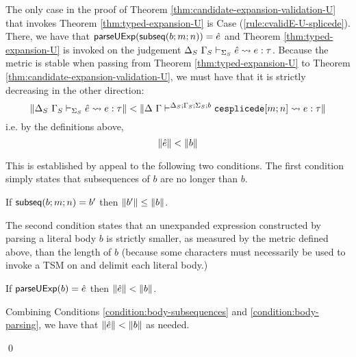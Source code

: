 The only case in the proof of Theorem \ref{thm:candidate-expansion-validation-U} that invokes Theorem \ref{thm:typed-expansion-U} is Case (\ref{rule:cvalidE-U-splicede}). There, we have that $\mathsf{parseUExp}(\mathsf{subseq}(b; m; n))=\hat{e}$ and Theorem \ref{thm:typed-expansion-U} is invoked on the judgement $\Delta_S~\Gamma_S \vdash_{\Sigma_S} \hat{e} \leadsto e : \tau$. Because the metric is stable when passing from Theorem \ref{thm:typed-expansion-U} to Theorem \ref{thm:candidate-expansion-validation-U}, we must have that it is strictly decreasing in the other direction:
\[\Vert \Delta_S~\Gamma_S \vdash_{\Sigma_S} \hat{e} \leadsto e : \tau \Vert < \Vert \Delta~\Gamma\vdash^{\Delta_S; \Gamma_S; \Sigma_S; b} \texttt{cesplicede}[m; n] \leadsto e : \tau \Vert\]
i.e. by the definitions above, 
\[\Vert \hat{e} \Vert < \Vert b \Vert\]

This is established by appeal to the following two conditions. The first condition simply states that subsequences of $b$ are no longer than $b$.
\begin{condition}\label{condition:body-subsequences} If $\mathsf{subseq}(b; m; n)=b'$ then $\Vert b' \Vert \leq \Vert b \Vert$. \end{condition}
The second condition states that an unexpanded expression constructed by parsing a literal body $b$ is strictly smaller, as measured by the metric defined above, than the length of $b$ (because some characters must necessarily be used to invoke a TSM on and delimit each literal body.)
\begin{condition}\label{condition:body-parsing} If $\mathsf{parseUExp}(b)=\hat{e}$ then $\Vert \hat{e} \Vert < \Vert b \Vert$.\end{condition}

Combining Conditions \ref{condition:body-subsequences} and \ref{condition:body-parsing}, we have that $\Vert \hat{e} \Vert < \Vert b \Vert$ as needed.

\qed

